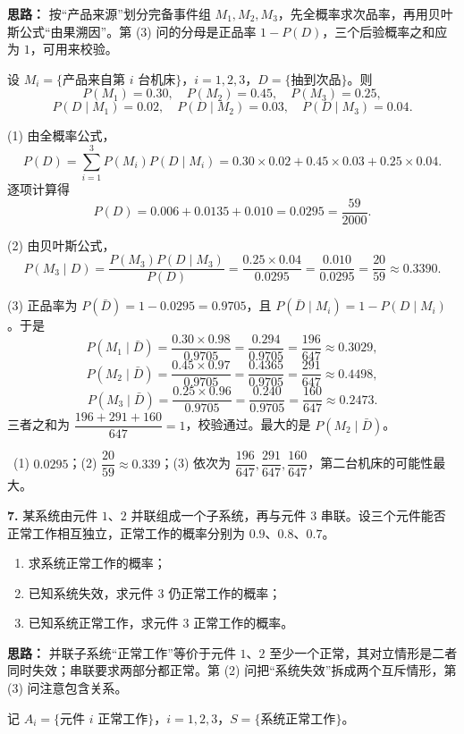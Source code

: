 \ifshowsolutions%
\textbf{思路：} 按“产品来源”划分完备事件组 $M_1,M_2,M_3$，先全概率求次品率，再用贝叶斯公式“由果溯因”。第 (3) 问的分母是正品率 $1-P(D)$，三个后验概率之和应为 $1$，可用来校验。

设 $M_i=\{\text{产品来自第 }i\text{ 台机床}\}$，$i=1,2,3$，$D=\{\text{抽到次品}\}$。则
\[
P(M_1)=0.30,\quad P(M_2)=0.45,\quad P(M_3)=0.25,
\]
\[
P(D\mid M_1)=0.02,\quad P(D\mid M_2)=0.03,\quad P(D\mid M_3)=0.04.
\]

(1) 由全概率公式，
\[
P(D)=\sum_{i=1}^{3}P(M_i)P(D\mid M_i)
=0.30\times0.02+0.45\times0.03+0.25\times0.04.
\]
逐项计算得
\[
P(D)=0.006+0.0135+0.010=0.0295=\frac{59}{2000}.
\]

(2) 由贝叶斯公式，
\[
P(M_3\mid D)=\frac{P(M_3)P(D\mid M_3)}{P(D)}
=\frac{0.25\times0.04}{0.0295}
=\frac{0.010}{0.0295}=\frac{20}{59}\approx0.3390.
\]

(3) 正品率为 $P(\bar D)=1-0.0295=0.9705$，且 $P(\bar D\mid M_i)=1-P(D\mid M_i)$。于是
\[
P(M_1\mid\bar D)=\frac{0.30\times0.98}{0.9705}=\frac{0.294}{0.9705}=\frac{196}{647}\approx0.3029,
\]
\[
P(M_2\mid\bar D)=\frac{0.45\times0.97}{0.9705}=\frac{0.4365}{0.9705}=\frac{291}{647}\approx0.4498,
\]
\[
P(M_3\mid\bar D)=\frac{0.25\times0.96}{0.9705}=\frac{0.240}{0.9705}=\frac{160}{647}\approx0.2473.
\]
三者之和为 $\dfrac{196+291+160}{647}=1$，校验通过。最大的是 $P(M_2\mid\bar D)$。

\ (1) $0.0295$；(2) $\dfrac{20}{59}\approx0.339$；(3) 依次为 $\dfrac{196}{647},\dfrac{291}{647},\dfrac{160}{647}$，第二台机床的可能性最大。

\else \answerarea[10] \fi%

\textbf{7.} 某系统由元件 $1$、$2$ 并联组成一个子系统，再与元件 $3$ 串联。设三个元件能否正常工作相互独立，正常工作的概率分别为 $0.9$、$0.8$、$0.7$。
\begin{enumerate}[label=(\arabic*)]
    \item 求系统正常工作的概率；
    \item 已知系统失效，求元件 $3$ 仍正常工作的概率；
    \item 已知系统正常工作，求元件 $3$ 正常工作的概率。
\end{enumerate}

\ifshowsolutions%
\textbf{思路：} 并联子系统“正常工作”等价于元件 $1$、$2$ 至少一个正常，其对立情形是二者同时失效；串联要求两部分都正常。第 (2) 问把“系统失效”拆成两个互斥情形，第 (3) 问注意包含关系。

记 $A_i=\{\text{元件 }i\text{ 正常工作}\}$，$i=1,2,3$，$S=\{\text{系统正常工作}\}$。

